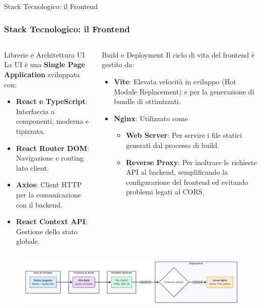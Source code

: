 \documentclass[8pt]{beamer}
\begin{document}
\begin{frame}{Stack Tecnologico: il Frontend}
  \frametitle{Stack Tecnologico: il Frontend}

  \begin{columns}[T]
    \begin{block}{Librerie e Architettura UI}
      La UI è una \textbf{Single Page Application} sviluppata con:
      \begin{itemize}
        \item[\large\faReact] \textbf{React e TypeScript}: Interfaccia a componenti, moderna e tipizzata.

        \item[\large\faRoute]  \textbf{React Router DOM}: Navigazione e routing lato client.

        \item[\large\faExchange*] \textbf{Axios}: Client HTTP per la comunicazione con il backend.

        \item[\large\faCogs] \textbf{React Context API}: Gestione dello stato globale.
      \end{itemize}
    \end{block}

    \begin{block}{Build e Deployment}
      Il ciclo di vita del frontend è gestito da:
      \begin{itemize}
        \item[\large\faBolt] \textbf{Vite}: Elevata velocità in sviluppo (Hot Module Replacement) e per la generazione di bundle di ottimizzati.
        \item[\large\faServer] \textbf{Nginx}: Utilizzato come
              \begin{itemize}
                \item \textbf{Web Server}: Per servire i file statici generati dal processo di build.
                \item \textbf{Reverse Proxy}: Per inoltrare le richieste API al backend, semplificando la configurazione del frontend ed evitando problemi legati al CORS.
              \end{itemize}
      \end{itemize}
    \end{block}
  \end{columns}

  \vfill %

  \begin{figure}
    \centering
    \includegraphics[width=\textwidth]{figures/frontend_stack.png}
  \end{figure}

\end{frame}
\end{document}
